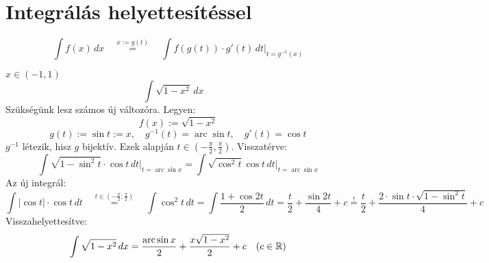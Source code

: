 \documentclass[a4paper,11.5pt]{article}
\DeclareMathOperator{\arc}{arc}
\begin{document}
	\section{Integrálás helyettesítéssel}
	\begin{revision}
		\[ \int f(x)\,dx\quad \overset{x:=g(t)}{=}\quad \int f(g(t))\cdot g'(t)\,dt\big|_{t=g^{-1}(x)} \]
	\end{revision}
	\begin{task}$x\in(-1,1)$
		\[\int\sqrt{1-x^2}\,dx \quad\]
		Szükségünk lesz számos új változóra. Legyen:
		\[ f(x):=\sqrt{1-x^2} \]
		\[ g(t) := \sin t := x,\quad g^{-1}(t) = \arc\sin t,\quad g'(t) = \cos t \]
		$g^{-1}$ létezik, hisz $g$ bijektív. Ezek alapján $t\in\left(-\frac{\pi}{2},\frac{\pi}{2} \right)$. Visszatérve:
		\[\int\sqrt{1-\sin^2t}\cdot\cos t\,dt\big|_{t=\arc\sin x}=\int\sqrt{\cos^2t}\cos t\,dt\big|_{t=\arc\sin x} \]
		Az új integrál:
		\[ \int|\cos t|\cdot\cos t\,dt\quad \overset{t\in\left(-\frac{\pi}{2};\frac{\pi}{2}\right)}{=}\quad \int\cos^2t\,dt=\int\frac{1+\cos2t}{2}\,dt=\frac{t}{2}+\frac{\sin2t}{4}+c \overset{!}{=} \frac{t}{2}+\frac{2\cdot\sin t\cdot\sqrt{1-\sin^2t}}{4}+c \]
		Visszahelyettesítve:
		\[ \int\sqrt{1-x^2}\,dx=\frac{\arc\sin x}{2}+\frac{x\sqrt{1-x^2}}{2}+c\quad (c\in\R) \] 
	\end{task}
	
\end{document}
